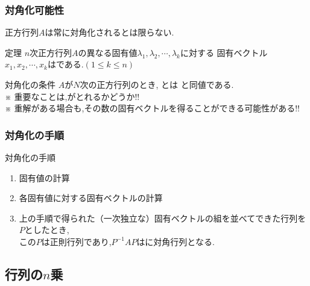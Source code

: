 \documentclass[a4paper]{jsarticle}
\begin{document}
\subsubsection{対角化可能性}
正方行列$A$は常に対角化されるとは限らない.
\begin{itembox}[l]{定理}
    $n$次正方行列$A$の異なる固有値$\lambda_1,\lambda_2,\cdots,\lambda_k$に対する
    固有ベクトル$x_1,x_2,\cdots,x_k$はである.$\left(1\leq k\leq n\right)$
\end{itembox}
\begin{itembox}[l]{対角化の条件}
    $A$が$N$次の正方行列のとき, とは
    と同値である.\\
    ※ 重要なことは,がとれるかどうか!!\\
    ※ 重解がある場合も,その数の固有ベクトルを得ることができる可能性がある!!
\end{itembox}
\subsubsection{対角化の手順}
\begin{itembox}[l]{対角化の手順}
    \begin{enumerate}[(1)]
        \item 固有値の計算
        \item 各固有値に対する固有ベクトルの計算
        \item 上の手順で得られた（一次独立な）固有ベクトルの組を並べてできた行列を$P$としたとき,\\
              この$P$は正則行列であり,$P^{-1}AP$はに対角行列となる.
    \end{enumerate}
\end{itembox}
\subsection{行列の$n$乗}
\end{document}
